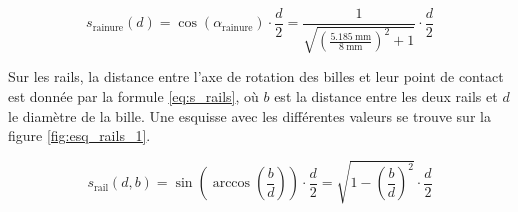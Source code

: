 \begin{equation}
    s_{\text{rainure}}(d) = \cos(\alpha_{\text{rainure}}) \cdot \frac{d}{2} = \frac{1}{\sqrt{\left(\frac{\SI{5.185}{\milli\metre}}{\SI{8}{\milli\metre}}\right)^2+1}} \cdot \frac{d}{2}
    \label{eq:s_rainure}
\end{equation}

Sur les rails, la distance entre l'axe de rotation des billes et leur point de contact est donnée par la formule \ref{eq:s_rails}, où $b$ est la distance entre les deux rails et $d$ le diamètre de la bille. Une esquisse avec les différentes valeurs se trouve sur la figure \ref{fig:esq_rails_1}.


\begin{equation}
    s_{\text{rail}}(d,b) = \sin\left(\arccos\left(\frac{b}{d}\right)\right) \cdot \frac{d}{2} = \sqrt{1-\left(\frac{b}{d}\right)^{2}} \cdot \frac{d}{2}
    \label{eq:s_rails}
\end{equation}

